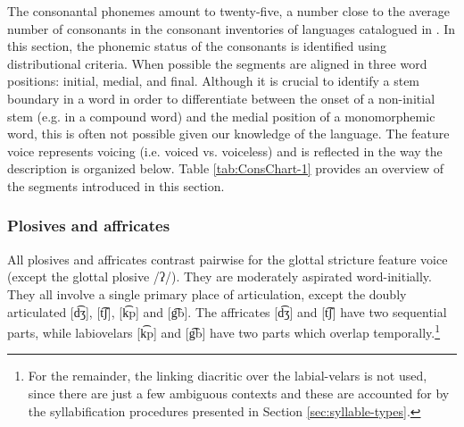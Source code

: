 The consonantal phonemes amount to twenty-five, a number close to the average number of consonants in the consonant inventories of languages catalogued in  \citet{Madd09}. In this section, the phonemic status of the consonants is
identified using distributional criteria. When possible the segments are aligned
in three word positions:  initial, medial,  and final. Although it is crucial to identify a stem boundary in a word in order to differentiate between the onset of a non-initial stem (e.g. in a compound word) and the medial position of a monomorphemic word,  this is often not possible given our knowledge of the language. The feature {\sc voice} represents voicing (i.e. voiced vs. voiceless) and is reflected in the way  the description is organized below.
Table \ref{tab:ConsChart-1} provides an overview of the segments introduced in this section.


\begin{table} 
 \caption{Phonetic and phonemic consonants in Chakali}
 \small
\label{tab:ConsChart-1} 

\end{table}


   
\subsubsection{Plosives and affricates}

All plosives and affricates contrast pairwise for the glottal stricture feature 
{\sc voice} (except  the glottal plosive /{ʔ}/). They are moderately 
aspirated word-initially. They all involve a single primary place of articulation, except  the 
doubly articulated [{d͡ʒ}], [{t͡ʃ}], [{k͡p}] and [{g͡b}].  
The affricates  [{d͡ʒ}]  and [{t͡ʃ}] have two sequential parts, while 
labiovelars  [{k͡p}] and [{g͡b}] have two parts which overlap 
temporally.\footnote{For the remainder,  the linking diacritic over the 
labial-velars is not used,  since there are just a few ambiguous contexts and 
these are accounted for by the syllabification procedures presented in  Section \ref{sec:syllable-types}.}

